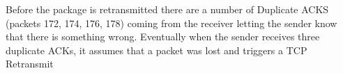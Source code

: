 Before the package is retransmitted there are a number of Duplicate ACKS (packets 172, 174, 176, 178) coming from the receiver letting the sender know that there is something wrong. Eventually when the sender receives three duplicate ACKs, it assumes that a packet was lost and triggers a TCP Retransmit